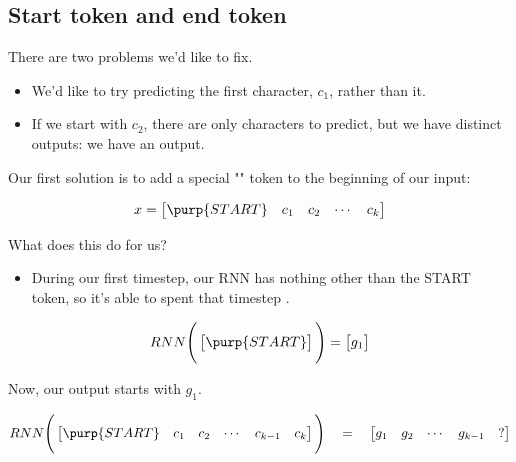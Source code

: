     \subsection{Start token and end token}

        There are two problems we'd like to fix.

        \begin{itemize}
            \item We'd like to try predicting the first character, $c_1$, rather than  it.
            \item If we start with $c_2$, there are only  characters to predict, but we have  distinct outputs: we have an  output.
        \end{itemize}

        \subsecdiv

        Our first solution is to add a special "" token to the beginning of our input:

        \begin{equation}
            x = \begin{bmatrix}
                \purp{START} & c_1 & c_2 & \cdots & c_k
            \end{bmatrix}
        \end{equation}

        What does this do for us?

        \begin{itemize}
            \item During our first timestep, our RNN has nothing other than the START token, so it's able to spent that timestep .
        \end{itemize}

        \begin{equation}
            RNN\Bigg(\begin{bmatrix}
                \purp{START}
            \end{bmatrix}\Bigg)
            =
            \begin{bmatrix}
                g_1
            \end{bmatrix}
        \end{equation}

        Now, our output starts with $g_1$.

        \begin{equation}
            RNN 
            \Bigg(
            \begin{bmatrix}
                \purp{START} & c_1 & c_2 & \cdots & c_{k-1} & c_{k}
            \end{bmatrix}
            \Bigg)
            \quad=\quad 
            \begin{bmatrix}
                g_1 & g_2 & \cdots & g_{k-1} & ?
            \end{bmatrix}
        \end{equation}

